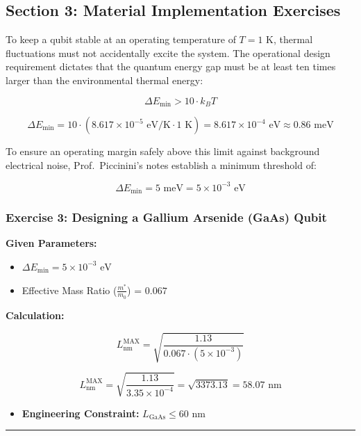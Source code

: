 \documentclass[
]{article}
\providecommand{\tightlist}{%
  \setlength{\itemsep}{0pt}\setlength{\parskip}{0pt}}
\begin{document}
\subsection{Section 3: Material Implementation
Exercises}\label{section-3-material-implementation-exercises}

To keep a qubit stable at an operating temperature of
\(T = 1 \text{ K}\), thermal fluctuations must not accidentally excite
the system. The operational design requirement dictates that the quantum
energy gap must be at least ten times larger than the environmental
thermal energy:

\[\Delta E_{\min} > 10 \cdot k_B T\]

\[\Delta E_{\min} = 10 \cdot (8.617 \times 10^{-5} \text{ eV/K} \cdot 1 \text{ K}) = 8.617 \times 10^{-4} \text{ eV} \approx 0.86 \text{ meV}\]

To ensure an operating margin safely above this limit against background
electrical noise, Prof.~Piccinini's notes establish a minimum threshold
of:

\[\Delta E_{\min} = 5 \text{ meV} = 5 \times 10^{-3} \text{ eV}\]

\subsubsection{Exercise 3: Designing a Gallium Arsenide (GaAs)
Qubit}\label{exercise-3-designing-a-gallium-arsenide-gaas-qubit}

\textbf{Given Parameters:}

\begin{itemize}
\tightlist
\item
  \(\Delta E_{\min} = 5 \times 10^{-3} \text{ eV}\)
\item
  Effective Mass Ratio (\(\frac{m^*}{m_0}\)) = \(0.067\)
\end{itemize}

\textbf{Calculation:}

\[L_{\text{nm}}^{\text{MAX}} = \sqrt{\frac{1.13}{0.067 \cdot (5 \times 10^{-3})}}\]

\[L_{\text{nm}}^{\text{MAX}} = \sqrt{\frac{1.13}{3.35 \times 10^{-4}}} = \sqrt{3373.13} = 58.07 \text{ nm}\]

\begin{itemize}
\tightlist
\item
  \textbf{Engineering Constraint:} \(L_{\text{GaAs}} \le 60 \text{ nm}\)
\end{itemize}

\begin{center}\rule{0.5\linewidth}{0.5pt}\end{center}
\end{document}
